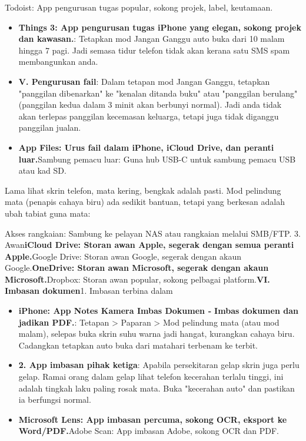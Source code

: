 
Todoist: App pengurusan tugas popular, sokong projek, label, keutamaan.

\begin{itemize}
  \item \textbf{Things 3: App pengurusan tugas iPhone yang elegan, sokong projek dan kawasan.}: Tetapkan mod Jangan Ganggu auto buka dari 10 malam hingga 7 pagi. Jadi semasa tidur telefon tidak akan kerana satu SMS spam membangunkan anda.
  \item \textbf{V. Pengurusan fail}: Dalam tetapan mod Jangan Ganggu, tetapkan "panggilan dibenarkan" ke "kenalan ditanda buku" atau "panggilan berulang" (panggilan kedua dalam 3 minit akan berbunyi normal). Jadi anda tidak akan terlepas panggilan kecemasan keluarga, tetapi juga tidak diganggu panggilan jualan.
  \item \textbf{App Files: Urus fail dalam iPhone, iCloud Drive, dan peranti luar.}Sambung pemacu luar: Guna hub USB-C untuk sambung pemacu USB atau kad SD.
\end{itemize}


Lama lihat skrin telefon, mata kering, bengkak adalah pasti. Mod pelindung mata (penapis cahaya biru) ada sedikit bantuan, tetapi yang berkesan adalah ubah tabiat guna mata:

\begin{tcbinfo}{Akses rangkaian: Sambung ke pelayan NAS atau rangkaian melalui SMB/FTP.}
3. Awan\textbf{iCloud Drive: Storan awan Apple, segerak dengan semua peranti Apple.}Google Drive: Storan awan Google, segerak dengan akaun Google.\textbf{OneDrive: Storan awan Microsoft, segerak dengan akaun Microsoft.}Dropbox: Storan awan popular, sokong pelbagai platform.\textbf{VI. Imbasan dokumen}1. Imbasan terbina dalam

\end{tcbinfo}

\begin{itemize}
  \item \textbf{iPhone: App Notes Kamera Imbas Dokumen ‑ Imbas dokumen dan jadikan PDF.}: Tetapan > Paparan > Mod pelindung mata (atau mod malam), selepas buka skrin suhu warna jadi hangat, kurangkan cahaya biru. Cadangkan tetapkan auto buka dari matahari terbenam ke terbit.
  \item \textbf{2. App imbasan pihak ketiga}: Apabila persekitaran gelap skrin juga perlu gelap. Ramai orang dalam gelap lihat telefon kecerahan terlalu tinggi, ini adalah tingkah laku paling rosak mata. Buka "kecerahan auto" dan pastikan ia berfungsi normal.
  \item \textbf{Microsoft Lens: App imbasan percuma, sokong OCR, eksport ke Word/PDF.}Adobe Scan: App imbasan Adobe, sokong OCR dan PDF.
\end{itemize}

